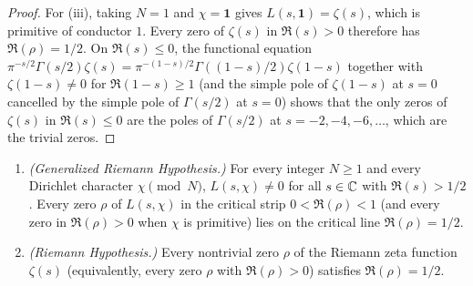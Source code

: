 \begin{proof}
For (iii), taking $N = 1$ and $\chi = \mathbf{1}$ gives $L(s, \mathbf{1}) = \zeta(s)$, which is primitive of conductor $1$. Every zero of $\zeta(s)$ in $\Re(s) > 0$ therefore has $\Re(\rho) = 1/2$. On $\Re(s) \le 0$, the functional equation $\pi^{-s/2}\Gamma(s/2)\zeta(s) = \pi^{-(1-s)/2}\Gamma((1-s)/2)\zeta(1-s)$ together with $\zeta(1-s) \neq 0$ for $\Re(1-s) \ge 1$ (and the simple pole of $\zeta(1-s)$ at $s=0$ cancelled by the simple pole of $\Gamma(s/2)$ at $s=0$) shows that the only zeros of $\zeta(s)$ in $\Re(s) \le 0$ are the poles of $\Gamma(s/2)$ at $s = -2, -4, -6, \dots$, which are the trivial zeros.
\end{proof}

\begin{corollary}
\label{cor:01:grh}
\leavevmode
\begin{enumerate}[label=\textup{(\roman*)}]
\item \emph{(Generalized Riemann Hypothesis.)} For every integer $N \ge 1$ and every Dirichlet character $\chi \pmod{N}$, $L(s, \chi) \neq 0$ for all $s \in \mathbb{C}$ with $\Re(s) > 1/2$. Every zero $\rho$ of $L(s, \chi)$ in the critical strip $0 < \Re(\rho) < 1$ (and every zero in $\Re(\rho) > 0$ when $\chi$ is primitive) lies on the critical line $\Re(\rho) = 1/2$.
\item \emph{(Riemann Hypothesis.)} Every nontrivial zero $\rho$ of the Riemann zeta function $\zeta(s)$ (equivalently, every zero $\rho$ with $\Re(\rho) > 0$) satisfies $\Re(\rho) = 1/2$.
\end{enumerate}
\end{corollary}

